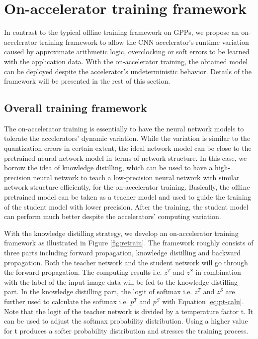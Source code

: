 \section{On-accelerator training framework} \label{sec:framework}
In contrast to the typical offline training framework on GPPs, we propose an 
on-accelerator training framework to allow the CNN accelerator's runtime variation 
caused by approximate arithmetic logic, overclocking or soft errors 
to be learned with the application data. With the on-accelerator training,
the obtained model can be deployed despite the accelerator's 
undeterministic behavior. Details of the framework will be presented in 
the rest of this section.

\begin{figure*}
        \caption{On-accelerator training framework with knowledge distilling}
        \label{fig:retrain}
\end{figure*}


\subsection{Overall training framework}
The on-accelerator training is essentially to have the neural 
network models to tolerate the accelerators' dynamic variation. 
While the variation is similar to the quantization 
errors in certain extent, the ideal network model can be 
close to the pretrained neural network model in terms of 
network structure. In this case, we borrow the idea of knowledge 
distilling\cite{distillation_38, distillation_39}, 
which can be used to have a high-precision neural network to teach a 
low-precision neural network with similar network structure efficiently, 
for the on-accelerator training. Basically, the offline pretrained 
model can be taken as a teacher model and used to guide the training of the 
student model with lower precision. After the training, the student model 
can perform much better despite the accelerators' computing variation.


With the knowledge distilling strategy, we develop an on-accelerator training 
framework as illustrated in Figure \ref{fig:retrain}. The framework roughly consists of three parts
including forward propagation, knowledge distilling and backward propagation. 
Both the teacher network and the student network will go through the 
forward propagation. The computing results i.e. $z^T$ and $z^S$ in 
combination with the label of the input image data will be fed to the 
knowledge distilling part. In the knowledge distilling part,  
the logit of softmax i.e. $z^T$ and $z^S$ are further used to calculate the 
softmax i.e. $p^T$ and $p^S$ with Equation \ref{eq:pt-calu}. 
Note that the logit of the teacher network is divided by a 
temperature factor t. It can be used to adjust the softmax 
probability distribution. Using a higher value for t 
produces a softer probability distribution and stresses 
the training process. 

